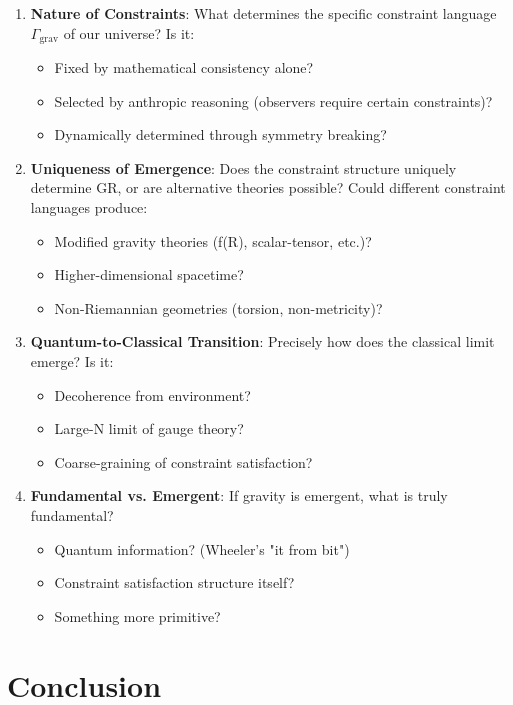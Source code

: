 \documentclass[11pt,a4paper]{article}
\theoremstyle{remark}
\theoremstyle{definition}
\begin{document}
\begin{enumerate}
\item \textbf{Nature of Constraints}: What determines the specific constraint language $\Gamma_{\text{grav}}$ of our universe? Is it:
\begin{itemize}
\item Fixed by mathematical consistency alone?
\item Selected by anthropic reasoning (observers require certain constraints)?
\item Dynamically determined through symmetry breaking?
\end{itemize}

\item \textbf{Uniqueness of Emergence}: Does the constraint structure uniquely determine GR, or are alternative theories possible? Could different constraint languages produce:
\begin{itemize}
\item Modified gravity theories (f(R), scalar-tensor, etc.)?
\item Higher-dimensional spacetime?
\item Non-Riemannian geometries (torsion, non-metricity)?
\end{itemize}

\item \textbf{Quantum-to-Classical Transition}: Precisely how does the classical limit emerge? Is it:
\begin{itemize}
\item Decoherence from environment?
\item Large-N limit of gauge theory?
\item Coarse-graining of constraint satisfaction?
\end{itemize}

\item \textbf{Fundamental vs. Emergent}: If gravity is emergent, what is truly fundamental?
\begin{itemize}
\item Quantum information? (Wheeler's "it from bit")
\item Constraint satisfaction structure itself?
\item Something more primitive?
\end{itemize}
\end{enumerate}

\section{Conclusion}
\end{document}
